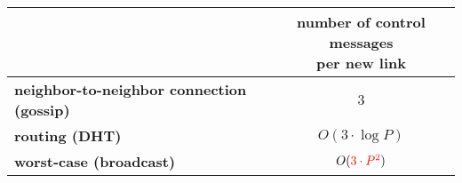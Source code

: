 \footnotesize

\begin{tabularx}{0.95\columnwidth}{@{}Xc@{}}
  & \makecell{number of control messages\\per new link} \\
  \hline\hline
  \textbf{neighbor-to-neighbor connection (gossip)} & $3$ \\ 
  \textbf{routing (DHT)} & $O(3 \cdot \log P)$  \\
  \textbf{worst-case (broadcast)} & $O(\textcolor{red}{ 3 \cdot P^2})$ 
\end{tabularx}

